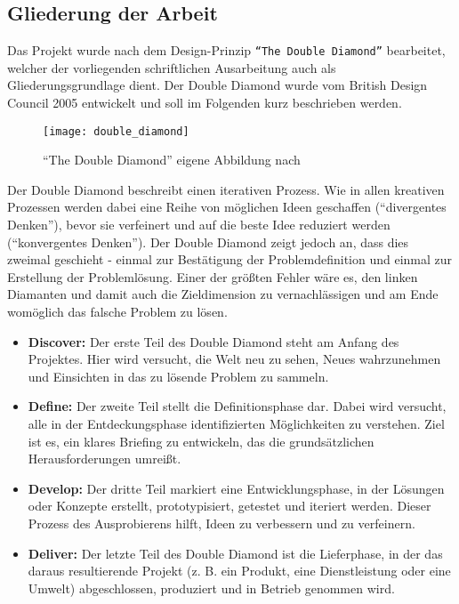 \subsection{Gliederung der Arbeit}
\label{sub:gliederung_der_arbeit}
  Das Projekt wurde nach dem Design-Prinzip \texttt{"`The Double Diamond"'} bearbeitet, welcher der vorliegenden schriftlichen Ausarbeitung auch als Gliederungsgrundlage dient. Der Double Diamond wurde vom British Design Council 2005 entwickelt und soll im Folgenden kurz beschrieben werden.\parencite{designcouncil}

  \begin{figure}[htbp]
    \begin{center}
      \texttt{[image: double\_diamond]}
      \caption{"`The Double Diamond"' eigene Abbildung nach \parencite{designcouncil}}
      \label{fig:double_diamond}
    \end{center}
  \end{figure}

  Der Double Diamond beschreibt einen iterativen Prozess. Wie in allen kreativen Prozessen werden dabei eine Reihe von möglichen Ideen geschaffen ("`divergentes Denken"'), bevor sie verfeinert und auf die beste Idee reduziert werden ("`konvergentes Denken"'). Der Double Diamond zeigt jedoch an, dass dies zweimal geschieht - einmal zur Bestätigung der Problemdefinition und einmal zur Erstellung der Problemlösung. Einer der größten Fehler wäre es, den linken Diamanten und damit auch die Zieldimension zu vernachlässigen und am Ende womöglich das falsche Problem zu lösen.

  \begin{itemize}[label={}]
    \item \textbf{Discover:} Der erste Teil des Double Diamond steht am Anfang des Projektes. Hier wird versucht, die Welt neu zu sehen, Neues wahrzunehmen und Einsichten in das zu lösende Problem zu sammeln.

    \item \textbf{Define:} Der zweite Teil stellt die Definitionsphase dar. Dabei wird versucht, alle in der Entdeckungsphase identifizierten Möglichkeiten zu verstehen. Ziel ist es, ein klares Briefing zu entwickeln, das die grundsätzlichen Herausforderungen umreißt.

    \item \textbf{Develop:} Der dritte Teil markiert eine Entwicklungsphase, in der Lösungen oder Konzepte erstellt, prototypisiert, getestet und iteriert werden. Dieser Prozess des Ausprobierens hilft, Ideen zu verbessern und zu verfeinern.

    \item \textbf{Deliver:} Der letzte Teil des Double Diamond ist die Lieferphase, in der das daraus resultierende Projekt (z. B. ein Produkt, eine Dienstleistung oder eine Umwelt) abgeschlossen, produziert und in Betrieb genommen wird.

  \end{itemize}

